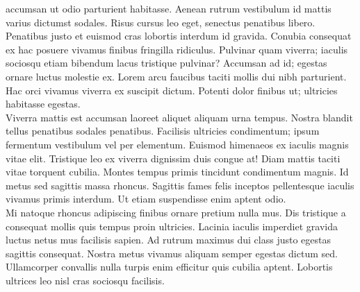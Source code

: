 \documentclass{article}
\begin{document}
accumsan ut odio parturient habitasse. Aenean rutrum vestibulum id mattis varius dictumst sodales. Risus cursus leo eget, senectus penatibus libero.\\Penatibus justo et euismod cras lobortis interdum id gravida. Conubia consequat ex hac posuere vivamus finibus fringilla ridiculus. Pulvinar quam viverra; iaculis sociosqu etiam bibendum lacus tristique pulvinar? Accumsan ad id; egestas ornare luctus molestie ex. Lorem arcu faucibus taciti mollis dui nibh parturient. Hac orci vivamus viverra ex suscipit dictum. Potenti dolor finibus ut; ultricies habitasse egestas.\\Viverra mattis est accumsan laoreet aliquet aliquam urna tempus. Nostra blandit tellus penatibus sodales penatibus. Facilisis ultricies condimentum; ipsum fermentum vestibulum vel per elementum. Euismod himenaeos ex iaculis magnis vitae elit. Tristique leo ex viverra dignissim duis congue at! Diam mattis taciti vitae torquent cubilia. Montes tempus primis tincidunt condimentum magnis. Id metus sed sagittis massa rhoncus. Sagittis fames felis inceptos pellentesque iaculis vivamus primis interdum. Ut etiam suspendisse enim aptent odio.\\Mi natoque rhoncus adipiscing finibus ornare pretium nulla mus. Dis tristique a consequat mollis quis tempus proin ultricies. Lacinia iaculis imperdiet gravida luctus netus mus facilisis sapien. Ad rutrum maximus dui class justo egestas sagittis consequat. Nostra metus vivamus aliquam semper egestas dictum sed. Ullamcorper convallis nulla turpis enim efficitur quis cubilia aptent. Lobortis ultrices leo nisl cras sociosqu facilisis.
\end{document}
